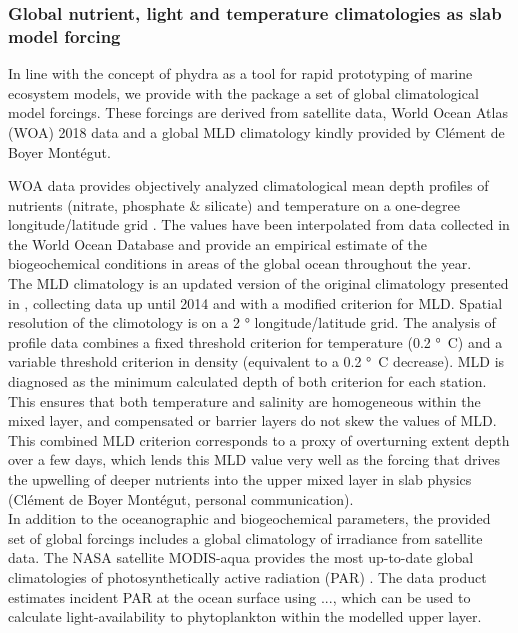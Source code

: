 \documentclass[template.tex]{subfiles}
\begin{document}
\subsubsection{Global nutrient, light and temperature climatologies as slab model forcing}
In line with the concept of phydra as a tool for rapid prototyping of marine ecosystem models, we provide with the package a set of global climatological model forcings. These forcings are derived from satellite data, World Ocean Atlas (WOA) 2018 data and a global MLD climatology kindly provided by Clément de Boyer Montégut.

WOA data provides objectively analyzed climatological mean depth profiles of nutrients (nitrate, phosphate \& silicate) and temperature on a one-degree longitude/latitude grid \cite{Garcia2019WORLDSilicate}. The values have been interpolated from data collected in the World Ocean Database and provide an empirical estimate of the biogeochemical conditions in areas of the global ocean throughout the year.\\

The MLD climatology is an updated version of the original climatology presented in  \citet{deBoyerMontegut2004MixedClimatology}, collecting data up until 2014 and with a modified criterion for MLD. Spatial resolution of the climotology is on a 2 \unit{°} longitude/latitude grid. The analysis of profile data combines a fixed threshold criterion for temperature (0.2 \unit{°C}) and a variable threshold criterion in density (equivalent to a 0.2 \unit{°C} decrease). MLD is diagnosed as the minimum calculated depth of both criterion for each station. This ensures that both temperature and salinity are homogeneous within the mixed layer, and compensated or barrier layers do not skew the values of MLD. This combined MLD criterion corresponds to a proxy of overturning extent depth over a few days, which lends this MLD value very well as the forcing that drives the upwelling of deeper nutrients into the upper mixed layer in slab physics (Clément de Boyer Montégut, personal communication).\\

In addition to the oceanographic and biogeochemical parameters, the provided set of global forcings includes a global climatology of irradiance from satellite data. The NASA satellite MODIS-aqua provides the most up-to-date global climatologies of photosynthetically active radiation (PAR) \cite{MODIS-Aqua2018NASAGroup}. The data product estimates incident PAR at the ocean surface using ..., which can be used to calculate light-availability to phytoplankton within the modelled upper layer.\\
\end{document}
